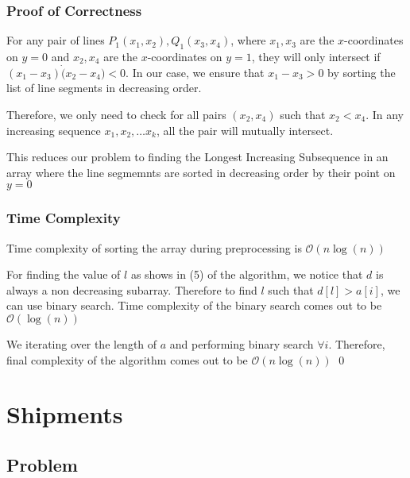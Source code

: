 \documentclass[12pt]{article}
\begin{document}
\subsubsection{Proof of Correctness}

For any pair of lines $P_1(x_1, x_2), Q_1(x_3, x_4)$, where $x_1, x_3$ are the $x$-coordinates on $y = 0$ and $x_2, x_4$ are the $x$-coordinates on $y = 1$, they will only intersect if $(x_1 - x_3) \dot (x_2 - x_4) < 0$. In our case, we ensure that $x_1 - x_3 > 0$ by sorting the list of line segments in decreasing order. 

Therefore, we only need to check for all pairs $(x_2, x_4)$ such that $x_2 < x_4$. In any increasing sequence $x_1, x_2, \dots x_k$, all the pair will mutually intersect. 

This reduces our problem to finding the Longest Increasing Subsequence in an array where the line segmemnts are sorted in decreasing order by their point on $y = 0$ 



\subsubsection{Time Complexity}

Time complexity of sorting the array during preprocessing is $\mathcal{O}(n\log(n))$

For finding the value of $l$ as shows in (5) of the algorithm, we notice that $d$ is always a non decreasing subarray. Therefore to find $l$ such that $d[l] > a[i]$, we can use binary search. Time complexity of the binary search comes out to be $\mathcal{O}(\log(n))$

We iterating over the length of $a$ and performing binary search $\forall i$. Therefore, final complexity of the algorithm comes out to be $\mathcal{O}(n\log(n))$
\qed

\pagebreak

\section{Shipments}

\subsection{Problem}
\end{document}
